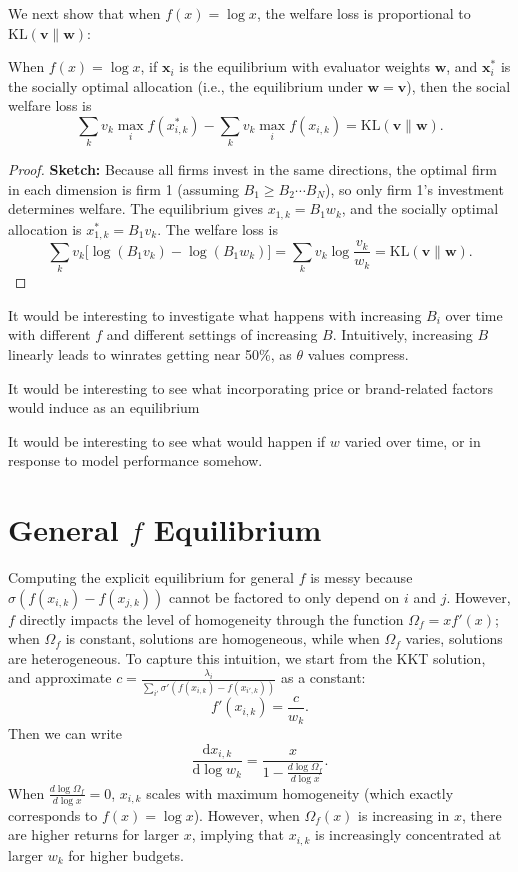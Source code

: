 \documentclass[msom,blindrev]{informs3_ExtAbst}
\begin{document}
We next show that when $f(x) = \log x$, the welfare loss is proportional to $\mathrm{KL}(\mathbf{v}\|\mathbf{w})$:
\begin{lemma}
    When $f(x) = \log x$, if $\mathbf{x}_{i}$ is the equilibrium with evaluator weights $\mathbf{w}$, and $\mathbf{x}^{*}_{i}$ is the socially optimal allocation (i.e., the equilibrium under $\mathbf{w} = \mathbf{v}$), then the social welfare loss is
    \[
    \sum_{k} v_{k}  \max\limits_{i} f(x^*_{i,k}) - \sum_{k} v_{k} \max\limits_{i} f(x_{i,k}) = \mathrm{KL}(\mathbf{v} \| \mathbf{w}).
    \]
\end{lemma}
\begin{proof}
    \textbf{Sketch:} Because all firms invest in the same directions, the optimal firm in each dimension is firm 1 (assuming $B_{1} \geq B_{2} \cdots B_{N}$), so only firm 1's investment determines welfare.
    The equilibrium gives $x_{1,k} = B_1 w_k$, and the socially optimal allocation is $x^{*}_{1,k} = B_{1} v_{k}$.
    The welfare loss is
    \[
    \sum_{k} v_{k} \bigl[\log(B_1 v_k) - \log(B_1 w_k)\bigr] = \sum_{k} v_{k} \log \frac{v_{k}}{w_{k}} = \mathrm{KL}(\mathbf{v} \| \mathbf{w}).
    \]
\end{proof}

\begin{todoblock}
    It would be interesting to investigate what happens with increasing $B_{i}$ over time with different $f$ and different settings of increasing $B$. Intuitively, increasing $B$ linearly leads to winrates getting near 50\%, as $\theta$ values compress.  
\end{todoblock}
\begin{todoblock}
    It would be interesting to see what incorporating price or brand-related factors would induce as an equilibrium 
\end{todoblock}
\begin{todoblock}
    It would be interesting to see what would happen if $w$ varied over time, or in response to model performance somehow. 
\end{todoblock}

\section{General $f$ Equilibrium}
Computing the explicit equilibrium for general $f$ is messy because $\sigma(f(x_{i,k})-f(x_{j,k}))$ cannot be factored to only depend on $i$ and $j$. 
However, $f$ directly impacts the level of homogeneity through the function $\Omega_{f} = xf'(x)$; when $\Omega_{f}$ is constant, solutions are homogeneous, while when $\Omega_{f}$ varies, solutions are heterogeneous. 
To capture this intuition, we start from the KKT solution, and approximate $c = \frac{\lambda_{i}}{\sum_{i'} \sigma'(f(x_{i,k})-f(x_{i',k}))}$ as a constant: 
\[
f'(x_{i,k}) = \frac{c}{w_{k}}.
\]
Then we can write 
\[
\frac{\mathrm{d}x_{i,k}}{\mathrm{d} \log w_{k}} = \frac{x}{1-\frac{d \log \Omega_{f}}{d \log x}}.
\]
When $\frac{d \log \Omega_{f}}{d \log x} = 0$, $x_{i,k}$ scales with maximum homogeneity (which exactly corresponds to $f(x) = \log x$). 
However, when $\Omega_{f}(x)$ is increasing in $x$, there are higher returns for larger $x$, implying that $x_{i,k}$ is increasingly concentrated at larger $w_{k}$ for higher budgets. 
\end{document}
